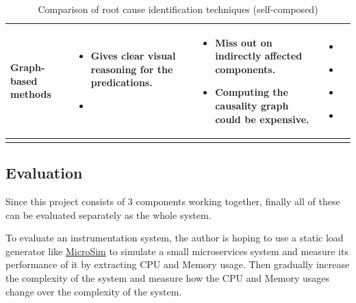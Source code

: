 \begin{longtable}{| p{23mm} | p{42mm} | p{42mm} | p{42mm} |}
    Graph-based methods &
    \vspace{-8mm}
    \begin{itemize}[leftmargin=0mm,noitemsep,nolistsep,label={}] 
        \item Gives clear visual reasoning for the predications.
        \item  
        \vspace{-7mm}
    \end{itemize} &
    \vspace{-8mm}
    \begin{itemize}[leftmargin=0mm,noitemsep,nolistsep,label={}] 
        \item Miss out on indirectly affected components.
        \item Computing the causality graph could be expensive.
        \vspace{-7mm}
    \end{itemize} &
    \vspace{-8mm}
    \begin{itemize}[leftmargin=0mm,noitemsep,nolistsep,label={}] 
        \item \cite{samir2019dla}
        \item \cite{wu2020microrca}
        \item \cite{ma2020automap}
        \item \cite{meng2020localizing}
        \vspace{-7mm}
    \end{itemize} \\ \hline

    \caption{Comparison of root cause identification techniques (self-composed)}
\end{longtable}

\subsection{Evaluation}

Since this project consists of 3 components working together, finally all of these can be evaluated separately as the whole system.

To evaluate an instrumentation system, the author is hoping to use a static load generator like \href{https://github.com/MrSupiri/MicroSim}{MicroSim} to simulate a small microservices system and measure its performance of it by extracting CPU and Memory usage. Then gradually increase the complexity of the system and measure how the CPU and Memory usages change over the complexity of the system.

